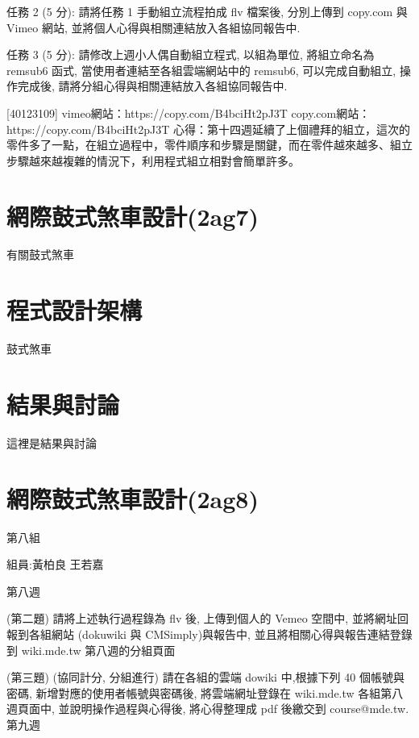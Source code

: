 \documentclass[]{article}
\begin{document}
任務 2 (5 分): 請將任務 1 手動組立流程拍成 flv 檔案後, 分別上傳到
copy.com 與 Vimeo 網站, 並將個人心得與相關連結放入各組協同報告中.

任務 3 (5 分): 請修改上週小人偶自動組立程式, 以組為單位, 將組立命名為
remsub6 函式, 當使用者連結至各組雲端網站中的 remsub6, 可以完成自動組立,
操作完成後, 請將分組心得與相關連結放入各組協同報告中.

{[}40123109{]} vimeo網站：https://copy.com/B4bciHt2pJ3T
copy.com網站：https://copy.com/B4bciHt2pJ3T
心得：第十四週延續了上個禮拜的組立，這次的零件多了一點，在組立過程中，零件順序和步驟是關鍵，而在零件越來越多、組立步驟越來越複雜的情況下，利用程式組立相對會簡單許多。

\section{網際鼓式煞車設計(2ag7)}\label{ux7db2ux969bux9f13ux5f0fux715eux8ecaux8a2dux8a082ag7}

有關鼓式煞車

\section{程式設計架構}\label{ux7a0bux5f0fux8a2dux8a08ux67b6ux69cb-1}

鼓式煞車

\section{結果與討論}\label{ux7d50ux679cux8207ux8a0eux8ad6-1}

這裡是結果與討論

\section{網際鼓式煞車設計(2ag8)}\label{ux7db2ux969bux9f13ux5f0fux715eux8ecaux8a2dux8a082ag8}

第八組

組員:黃柏良 王若嘉

第八週

(第二題) 請將上述執行過程錄為 flv 後, 上傳到個人的 Vemeo 空間中,
並將網址回報到各組網站 (dokuwiki 與 CMSimply)與報告中,
並且將相關心得與報告連結登錄到 wiki.mde.tw 第八週的分組頁面

(第三題) (協同計分, 分組進行) 請在各組的雲端 dowiki 中,根據下列 40
個帳號與密碼, 新增對應的使用者帳號與密碼後, 將雲端網址登錄在 wiki.mde.tw
各組第八週頁面中, 並說明操作過程與心得後, 將心得整理成 pdf 後繳交到
course@mde.tw. 第九週
\end{document}
